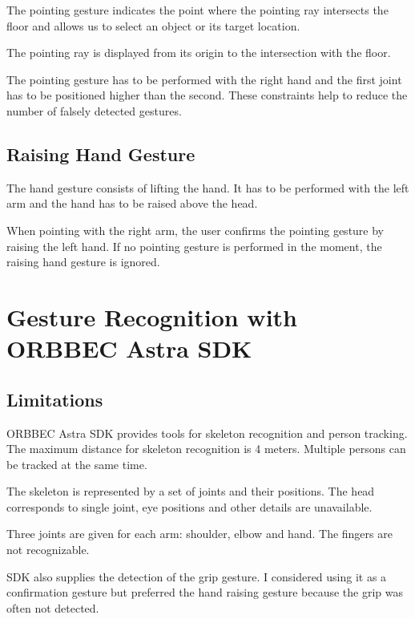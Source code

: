 The pointing gesture indicates the point where the pointing ray intersects the floor and allows us to select an object or its target location.\par
The pointing ray is displayed from its origin to the intersection with the floor.\par
The pointing gesture has to be performed with the right hand and the first joint has to be positioned higher than the second. These constraints help to reduce the number of falsely detected gestures.\par

\subsection{Raising Hand Gesture}
The hand gesture consists of lifting the hand. It has to be performed with the left arm and the hand  has to be raised above the head.\par
When pointing with the right arm, the user confirms the pointing gesture by raising the left hand. If no pointing gesture is performed in the moment, the raising hand gesture is ignored.\par

\section{Gesture Recognition with ORBBEC Astra SDK}

\subsection{Limitations}
ORBBEC Astra SDK provides tools for skeleton recognition and person tracking. The maximum distance for skeleton recognition is 4 meters. Multiple persons can be tracked at the same time.\par
The skeleton is represented by a set of joints and their positions. The head corresponds to single joint, eye positions and other details are unavailable.\par
Three joints are given for each arm: shoulder, elbow and hand. The fingers are not recognizable.\par
SDK also supplies the detection of the grip gesture. I considered using it as a confirmation gesture but preferred the hand raising gesture because the grip was often not detected.\par

